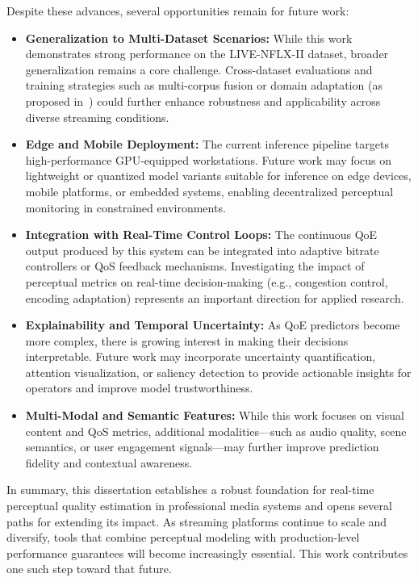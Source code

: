 Despite these advances, several opportunities remain for future work:

\begin{itemize}
    \item \textbf{Generalization to Multi-Dataset Scenarios:} While this work demonstrates strong performance on the LIVE-NFLX-II dataset, broader generalization remains a core challenge. Cross-dataset evaluations and training strategies such as multi-corpus fusion or domain adaptation (as proposed in~\cite{li2023unified}) could further enhance robustness and applicability across diverse streaming conditions.

    \item \textbf{Edge and Mobile Deployment:} The current inference pipeline targets high-performance GPU-equipped workstations. Future work may focus on lightweight or quantized model variants suitable for inference on edge devices, mobile platforms, or embedded systems, enabling decentralized perceptual monitoring in constrained environments.

    \item \textbf{Integration with Real-Time Control Loops:} The continuous QoE output produced by this system can be integrated into adaptive bitrate controllers or QoS feedback mechanisms. Investigating the impact of perceptual metrics on real-time decision-making (e.g., congestion control, encoding adaptation) represents an important direction for applied research.

    \item \textbf{Explainability and Temporal Uncertainty:} As QoE predictors become more complex, there is growing interest in making their decisions interpretable. Future work may incorporate uncertainty quantification, attention visualization, or saliency detection to provide actionable insights for operators and improve model trustworthiness.

    \item \textbf{Multi-Modal and Semantic Features:} While this work focuses on visual content and QoS metrics, additional modalities—such as audio quality, scene semantics, or user engagement signals—may further improve prediction fidelity and contextual awareness.
\end{itemize}

In summary, this dissertation establishes a robust foundation for real-time perceptual quality estimation in professional media systems and opens several paths for extending its impact. As streaming platforms continue to scale and diversify, tools that combine perceptual modeling with production-level performance guarantees will become increasingly essential. This work contributes one such step toward that future.

